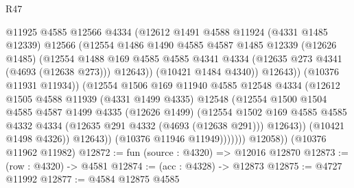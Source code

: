 \begin{lexlean}{R47}
\begin{coremodule}
                            @11925
                            @4585
                            @12566
                            @4334
                            (@12612
                              @1491
                              @4588
                              @11924
                              (@4331 @1485 @12339)
                              @12566
                              (@12554
                                @1486
                                @1490
                                @4585
                                @4587
                                @1485
                                @12339
                                (@12626 @1485)
                                (@12554
                                  @1488
                                  @169
                                  @4585
                                  @4585
                                  @4341
                                  @4334
                                  (@12635 @273 @4341 (@4693 (@12638 @273)))
                                  @12643))
                              (@10421 @1484 @4340))
                            @12643))
                        (@10376 @11931 @11934))
                      (@12554
                        @1506
                        @169
                        @11940
                        @4585
                        @12548
                        @4334
                        (@12612
                          @1505
                          @4588
                          @11939
                          (@4331 @1499 @4335)
                          @12548
                          (@12554
                            @1500
                            @1504
                            @4585
                            @4587
                            @1499
                            @4335
                            (@12626 @1499)
                            (@12554
                              @1502
                              @169
                              @4585
                              @4585
                              @4332
                              @4334
                              (@12635 @291 @4332 (@4693 (@12638 @291)))
                              @12643))
                          (@10421 @1498 @4326))
                        @12643))
                    (@10376 @11946 @11949)))))))
        @12058))
    (@10376 @11962 @11982)
@12872 := fun (source : @4320) => @12016 @12870
@12873 := (row : @4320) -> @4581
@12874 := (acc : @4328) -> @12873
@12875 := @4727 @11992
@12877 := @4584 @12875 @4585

\end{coremodule}
\end{lexlean}
